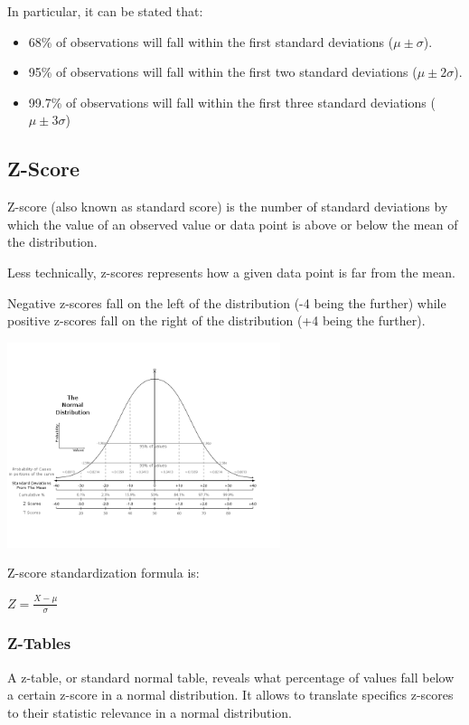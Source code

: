 \documentclass{article}
\begin{document}
In particular, it can be stated that:
\begin{itemize}
    \item 68\% of observations will fall within the first standard deviations ($\mu \pm \sigma $).
    \item 95\% of observations will fall within the first two standard deviations ($\mu \pm 2\sigma $).
    \item 99.7\% of observations will fall within the first three standard deviations ($\mu \pm 3\sigma $)
\end{itemize}

\subsection{Z-Score}
Z-score (also known as standard score) is the number of standard deviations by which the value of an observed value or data point is above or below the mean of the distribution. 

Less technically, z-scores represents how a given data point is far from the mean.

Negative z-scores fall on the left of the distribution (-4 being the further) while positive z-scores fall on the right of the distribution (+4 being the further).

\includegraphics[width=8cm, height=6cm]{normal_distribution}

Z-score standardization formula is:

$\displaystyle Z={\frac {X-\mu }{\sigma }}$

\subsubsection{Z-Tables}
A z-table, or standard normal table, reveals what percentage of values fall below a certain z-score in a normal distribution. It allows to translate specifics z-scores to their statistic relevance in a normal distribution.
\end{document}
